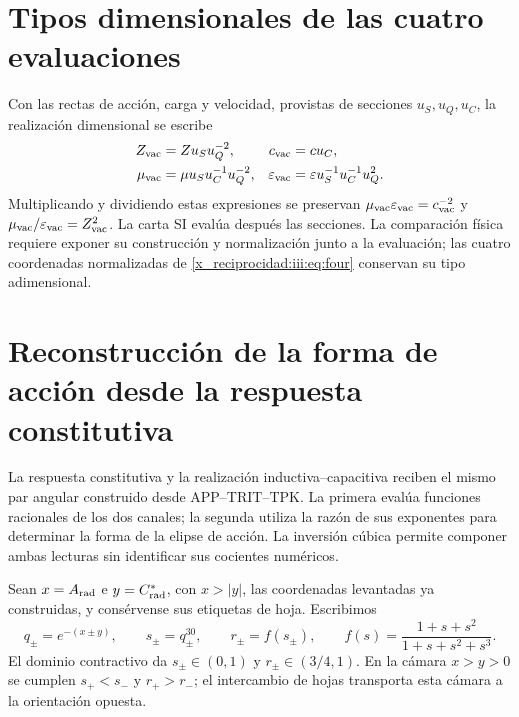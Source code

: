 \section{Tipos dimensionales de las cuatro evaluaciones}

Con las rectas de acción, carga y velocidad, provistas de secciones
$u_S,u_Q,u_C$, la realización dimensional se escribe
\begin{align}
 Z_{\rm vac}&=\widehat Z u_Su_Q^{-2},&
 c_{\rm vac}&=\widehat c u_C,\\
 \mu_{\rm vac}&=\widehat\mu u_Su_C^{-1}u_Q^{-2},&
 \varepsilon_{\rm vac}&=\widehat\varepsilon u_S^{-1}u_C^{-1}u_Q^2.
 \label{x_reciprocidad:iii:eq:dimensions}
\end{align}
Multiplicando y dividiendo estas expresiones se preservan
$\mu_{\rm vac}\varepsilon_{\rm vac}=c_{\rm vac}^{-2}$ y
$\mu_{\rm vac}/\varepsilon_{\rm vac}=Z_{\rm vac}^2$.
La carta SI evalúa después las secciones. La comparación física requiere
exponer su construcción y normalización junto a la evaluación; las cuatro
coordenadas normalizadas de \eqref{x_reciprocidad:iii:eq:four} conservan su tipo adimensional.



\section{Reconstrucción de la forma de acción desde la respuesta constitutiva}
\label{x_reciprocidad:iii:subsec:puente-forma-LC}

La respuesta constitutiva y la realización inductiva--capacitiva reciben
el mismo par angular construido desde APP--TRIT--TPK. La primera evalúa
funciones racionales de los dos canales; la segunda utiliza la razón de
sus exponentes para determinar la forma de la elipse de acción. La
inversión cúbica permite componer ambas lecturas sin identificar sus
cocientes numéricos.

Sean $x=A_{\rm rad}$ e $y=C^*_{\rm rad}$, con $x>|y|$, las coordenadas
levantadas ya construidas, y consérvense sus etiquetas de hoja. Escribimos
\begin{equation}
 q_\pm=e^{-(x\pm y)},\qquad s_\pm=q_\pm^{30},\qquad
 r_\pm=f(s_\pm),\qquad
 f(s)=\frac{1+s+s^2}{1+s+s^2+s^3}.
 \label{x_reciprocidad:iii:eq:forma-canales}
\end{equation}
El dominio contractivo da $s_\pm\in(0,1)$ y
$r_\pm\in(3/4,1)$. En la cámara $x>y>0$ se cumplen
$s_+<s_-$ y $r_+>r_-$; el intercambio de hojas transporta esta cámara
a la orientación opuesta.

